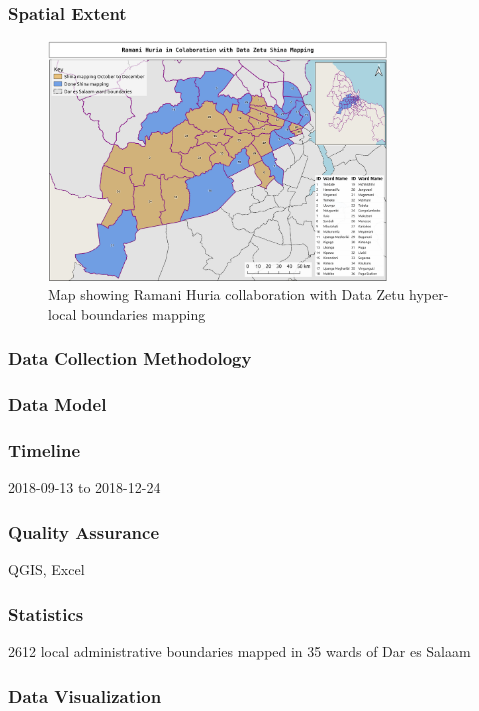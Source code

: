 \documentclass[a4paper,12pt,twoside]{article}
\begin{document}
\subsubsection{Spatial Extent}
\begin{figure}[h]
  \color{RHgreen}\caption{Map showing Ramani Huria collaboration with Data Zetu hyper-local boundaries mapping}
  \centering
  \includegraphics[width=0.8\textwidth]{images/RH_DZ_shina_boundaries.png}
\end{figure}

\subsubsection{Data Collection Methodology}

\subsubsection{Data Model}

\subsubsection{Timeline}
2018-09-13 to 2018-12-24

\subsubsection{Quality Assurance}
QGIS, Excel

\subsubsection{Statistics}
2612 local administrative boundaries mapped in 35 wards of Dar es Salaam

\subsubsection{Data Visualization}
\end{document}
